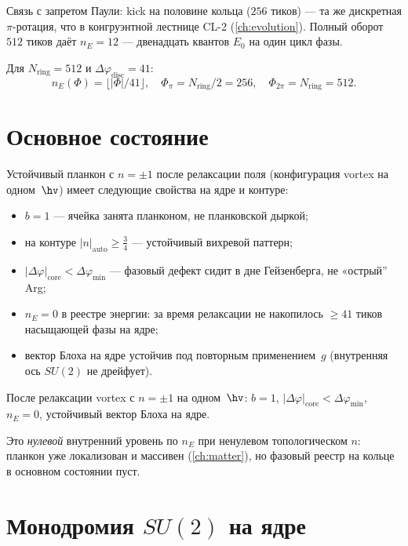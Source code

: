 Связь с запретом Паули: kick на половине кольца ($256$ тиков) --- та же дискретная
$\pi$-ротация, что в конгруэнтной лестнице CL-2 (\cref{ch:evolution}).
Полный оборот $512$ тиков даёт $n_E=12$ --- двенадцать квантов $E_0$ на один цикл фазы.

\begin{proposition}[Лестница $n_E$]
\label{prop:floor0-ne-ladder}
Для $N_{\mathrm{ring}}=512$ и $\Delta\varphi_{\mathrm{disc}}=41$:
\[
  n_E(\Phi) = \lfloor |\Phi| / 41\rfloor,\quad
  \Phi_{\pi} = N_{\mathrm{ring}}/2 = 256,\quad
  \Phi_{2\pi} = N_{\mathrm{ring}} = 512.
\]
\end{proposition}

\section{Основное состояние}
\label{sec:floor0-ground}

Устойчивый планкон с $n=\pm1$ после релаксации поля (конфигурация vortex на одном~$\hv$)
имеет следующие свойства на ядре и контуре:

\begin{itemize}[noitemsep]
\item $b=1$ --- ячейка занята планконом, не планковской дыркой;
\item на контуре $|n|_{\mathrm{auto}}\ge \tfrac34$ --- устойчивый вихревой паттерн;
\item $|\Delta\varphi|_{\mathrm{core}} < \Delta\varphi_{\min}$ --- фазовый дефект сидит
  в дне Гейзенберга, не «острый'' Arg;
\item $n_E=0$ в реестре энергии: за время релаксации не накопилось
  $\ge 41$ тиков насыщающей фазы на ядре;
\item вектор Блоха на ядре устойчив под повторным применением~$g$
  (внутренняя ось $SU(2)$ не дрейфует).
\end{itemize}

\begin{proposition}
\label{prop:floor0-vortex-ground}
После релаксации vortex с $n=\pm1$ на одном~$\hv$:
$b=1$, $|\Delta\varphi|_{\mathrm{core}}<\Delta\varphi_{\min}$, $n_E=0$,
устойчивый вектор Блоха на ядре.
\end{proposition}

Это \emph{нулевой} внутренний уровень по $n_E$ при ненулевом топологическом $n$:
планкон уже локализован и массивен (\cref{ch:matter}), но фазовый реестр на кольце
в основном состоянии пуст.

\section{Монодромия \texorpdfstring{$SU(2)$}{SU(2)} на ядре}
\label{sec:floor0-su2}

